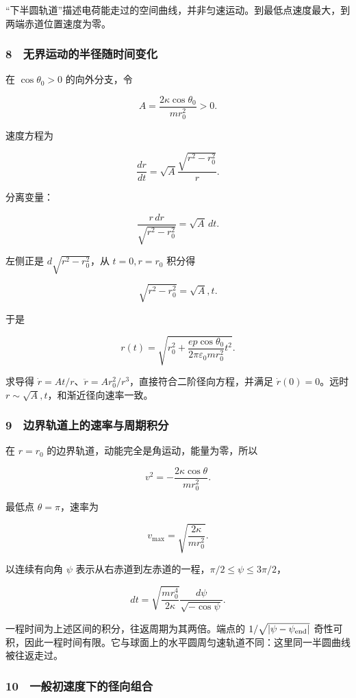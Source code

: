 \documentclass[12pt,a4paper,fontset=fandol]{ctexart}
\begin{document}
``下半圆轨道''描述电荷能走过的空间曲线，并非匀速运动。到最低点速度最大，到两端赤道位置速度为零。

\subsubsection{8　无界运动的半径随时间变化}\label{ux65e0ux754cux8fd0ux52a8ux7684ux534aux5f84ux968fux65f6ux95f4ux53d8ux5316}

在 \(\cos\theta_0>0\) 的向外分支，令

\[A=\frac{2\kappa\cos\theta_0}{mr_0^2}>0.\]

速度方程为

\[\frac{dr}{dt}=\sqrt A\frac{\sqrt{r^2-r_0^2}}r.\]

分离变量：

\[\frac{r\,dr}{\sqrt{r^2-r_0^2}}=\sqrt A\,dt.\]

左侧正是 \(d\sqrt{r^2-r_0^2}\)，从 \(t=0,r=r_0\) 积分得

\[\sqrt{r^2-r_0^2}=\sqrt A,t.\]

于是

\[\boxed{r(t)=\sqrt{r_0^2+
\frac{ep\cos\theta_0}{2\pi\varepsilon_0mr_0^2}t^2}.}\]

求导得
\(\dot r=At/r\)、\(\ddot r=Ar_0^2/r^3\)，直接符合二阶径向方程，并满足
\(\dot r(0)=0\)。远时 \(r\sim\sqrt A,t\)，和渐近径向速率一致。

\subsubsection{9　边界轨道上的速率与周期积分}\label{ux8fb9ux754cux8f68ux9053ux4e0aux7684ux901fux7387ux4e0eux5468ux671fux79efux5206}

在 \(r=r_0\) 的边界轨道，动能完全是角运动，能量为零，所以

\[v^2=-\frac{2\kappa\cos\theta}{mr_0^2}.\]

最低点 \(\theta=\pi\)，速率为

\[v_{\max}=\sqrt{\frac{2\kappa}{mr_0^2}}.\]

以连续有向角 \(\psi\)
表示从右赤道到左赤道的一程，\(\pi/2\le\psi\le3\pi/2\)，

\[dt=\sqrt{\frac{mr_0^4}{2\kappa}}
\frac{d\psi}{\sqrt{-\cos\psi}}.\]

一程时间为上述区间的积分，往返周期为其两倍。端点的
\(1/\sqrt{|\psi-\psi_{\rm end}|}\)
奇性可积，因此一程时间有限。它与球面上的水平圆周匀速轨道不同：这里同一半圆曲线被往返走过。

\subsubsection{10　一般初速度下的径向组合}\label{ux4e00ux822cux521dux901fux5ea6ux4e0bux7684ux5f84ux5411ux7ec4ux5408}
\end{document}
